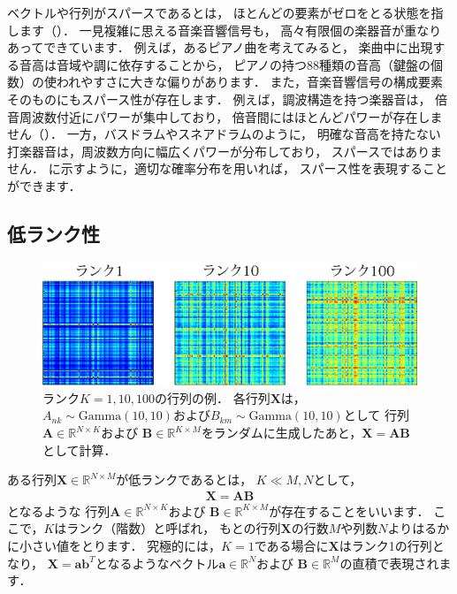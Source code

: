 ベクトルや行列がスパースであるとは，
ほとんどの要素がゼロをとる状態を指します（）．
一見複雑に思える音楽音響信号も，
高々有限個の楽器音が重なりあってできています．
例えば，あるピアノ曲を考えてみると，
楽曲中に出現する音高は音域や調に依存することから，
ピアノの持つ88種類の音高（鍵盤の個数）の使われやすさに大きな偏りがあります．
また，音楽音響信号の構成要素そのものにもスパース性が存在します．
例えば，調波構造を持つ楽器音は，
倍音周波数付近にパワーが集中しており，
倍音間にはほとんどパワーが存在しません（）．
一方，バスドラムやスネアドラムのように，
明確な音高を持たない打楽器音は，周波数方向に幅広くパワーが分布しており，
スパースではありません．
に示すように，適切な確率分布を用いれば，
スパース性を表現することができます．

\subsection{低ランク性}

\begin{figure}[t]
\centering
\includegraphics[width=.99\linewidth]{sections/music/low_rank_matrices}
\caption{ランク$K=1,10,100$の行列の例．
各行列$\bm{X}$は，$A_{nk} \sim \mbox{Gamma}(10,10)$および$B_{km} \sim \mbox{Gamma}(10,10)$として
行列$\bm{A} \in \mathbb{R}^{N \times K}$および
$\bm{B} \in \mathbb{R}^{K \times M}$をランダムに生成したあと，$\bm{X}=\bm{A}\bm{B}$として計算．}
\label{fig:low_rank_matrices}
\end{figure}

ある行列$\bm{X} \in \mathbb{R}^{N \times M}$が低ランクであるとは，
$K \ll M, N$として，
\begin{align}
\bm{X} = \bm{A}\bm{B}
\end{align}
となるような
行列$\bm{A} \in \mathbb{R}^{N \times K}$および
$\bm{B} \in \mathbb{R}^{K \times M}$が存在することをいいます．
ここで，$K$はランク（階数）と呼ばれ，
もとの行列$\bm{X}$の行数$M$や列数$N$よりはるかに小さい値をとります．
究極的には，$K=1$である場合に$\bm{X}$はランク1の行列となり，
$\bm{X} = \bm{a}\bm{b}^T$となるようなベクトル$\bm{a} \in \mathbb{R}^{N}$および
$\bm{B} \in \mathbb{R}^{M}$の直積で表現されます．

